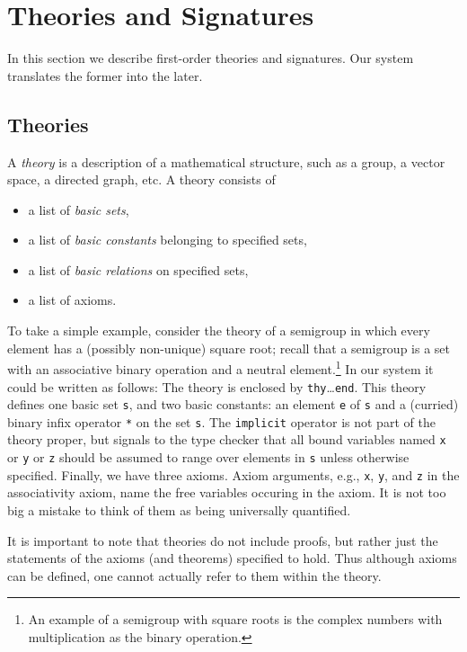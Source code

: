 
\section{Theories and Signatures}
\label{sec:theories-signatures}

In this section we describe first-order theories and signatures.
Our system translates the former into the later.

\subsection{Theories}
\label{sec:theories}

A \emph{theory} is a description of a mathematical structure, such as
a group, a vector space, a directed graph, etc. A theory consists of
%
\begin{itemize}
\item a list of \emph{basic sets},
\item a list of \emph{basic constants} belonging to specified sets,
\item a list of \emph{basic relations} on specified sets,
\item a list of axioms.
\end{itemize}
%
To take a simple example, consider the theory of a semigroup in which
every element has a (possibly non-unique) square root; recall that a
semigroup is a set with an associative binary operation and a neutral
element.\footnote{An example of a semigroup with square roots is the
  complex numbers with multiplication as the binary operation.} In our
system it could be written as follows:
%
%
The theory is enclosed by \Verb|thy|\ldots\Verb|end|. This theory
defines one basic set \Verb|s|, and two basic constants: an element
\Verb|e| of \Verb|s| and a (curried) binary infix operator \Verb|*| on
the set \Verb|s|. The \Verb|implicit| operator is not part of the
theory proper, but signals to the type checker that all bound
variables named \Verb|x| or \Verb|y| or \Verb|z| should be assumed to
range over elements in \Verb|s| unless otherwise specified. Finally,
we have three axioms. Axiom arguments, e.g., \Verb|x|, \Verb|y|, and
\Verb|z| in the associativity axiom, name the free variables occuring
in the axiom. It is not too big a mistake to think of them as being
universally quantified.

It is important to note that theories do not include proofs, but
rather just the statements of the axioms (and theorems) specified to
hold. Thus although axioms can be defined, one cannot actually refer
to them within the theory.

